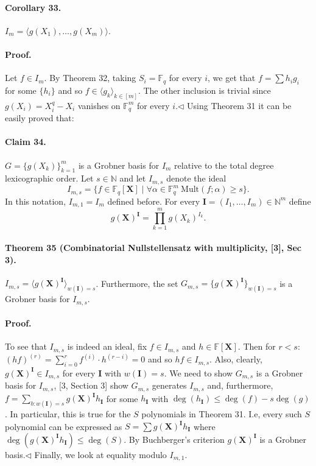 \paragraph{Corollary 33.} $I_m=\langle g(X_1),\ldots,g(X_m)\rangle$.
\paragraph{Proof.} Let $f\in I_m$. By Theorem 32, taking $S_i=\mathbb F_q$ for every $i$, we get that $f=\sum h_ig_i$ for some $\{h_i\}$ and so $f\in\langle g_k\rangle_{k\in[m]}$. The other inclusion is trivial since $g(X_i)=X_i^q-X_i$ vanishes on $\mathbb F_q^m$ for every $i$.\hfill$\triangleleft$
Using Theorem 31 it can be easily proved that:
\paragraph{Claim 34.} $G=\{g(X_k)\}_{k=1}^m$ is a Grobner basis for $I_m$ relative to the total degree lexicographic order.
Let $s\in\mathbb N$ and let $I_{m,s}$ denote the ideal
\[I_{m,s}=\{f\in\mathbb F_q[\boldsymbol X]\mid\forall\alpha\in\mathbb F_q^m\ \mathrm{Mult}(f;\alpha)\geq s\}.\]
In this notation, $I_{m,1}=I_m$ defined before. For every $\boldsymbol I=(I_1,\ldots,I_m)\in\mathbb N^m$ define
\[g(\boldsymbol X)^{\boldsymbol I}=\prod_{k=1}^mg(X_k)^{I_k}.\]
\paragraph{Theorem 35 (Combinatorial Nullstellensatz with multiplicity, [3], Sec 3).} $I_{m,s}=\langle g(\boldsymbol X)^{\boldsymbol I}\rangle_{w(\boldsymbol I)=s}$. Furthermore, the set $G_{m,s}=\{g(\boldsymbol X)^{\boldsymbol I}\}_{w(\boldsymbol I)=s}$ is a Grobner basis for $I_{m,s}$.
\paragraph{Proof.} To see that $I_{m,s}$ is indeed an ideal, fix $f\in I_{m,s}$ and $h\in\mathbb F[\boldsymbol X]$. Then for $r<s$: $(hf)^{(r)}=\sum_{i=0}^rf^{(i)}\cdot h^{(r-i)}=0$ and so $hf\in I_{m,s}$. Also, clearly, $g(\boldsymbol X)^{\boldsymbol I}\in I_{m,s}$ for every $\boldsymbol I$ with $w(\boldsymbol I)=s$. We need to show $G_{m,s}$ is a Grobner basis for $I_{m,s}$,
[3, Section 3] show $G_{m,s}$ generates $I_{m,s}$ and, furthermore, $f=\sum_{b:w(\boldsymbol I)=s}g(\boldsymbol X)^{\boldsymbol I}h_{\boldsymbol I}$ for some $h_{\boldsymbol I}$ with $\deg(h_{\boldsymbol I})\leq\deg(f)-s\deg(g)$. In particular, this is true for the $S$ polynomials in Theorem 31. I.e, every such $S$ polynomial can be expressed as $S=\sum g(\boldsymbol X)^{\boldsymbol I}h_{\boldsymbol I}$ where $\deg(g(\boldsymbol X)^{\boldsymbol I}h_{\boldsymbol I})\leq\deg(S)$. By Buchberger's criterion $g(\boldsymbol X)^{\boldsymbol I}$ is a Grobner basis.\hfill$\triangleleft$
Finally, we look at equality modulo $I_{m,1}$.
